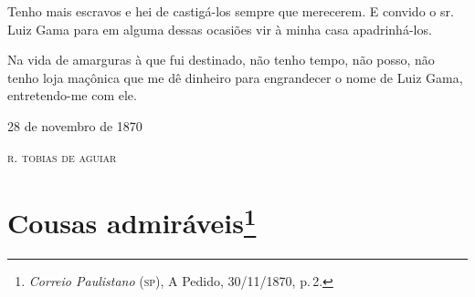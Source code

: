 Tenho mais escravos e hei de castigá-los sempre que merecerem. E convido
o sr.\,Luiz Gama para em alguma dessas ocasiões vir à minha casa
apadrinhá-los.

Na vida de amarguras à que fui destinado, não tenho tempo, não posso,
não tenho loja maçônica que me dê dinheiro para engrandecer o nome de
Luiz Gama, entretendo-me com ele.

\begin{flushright}
28 de novembro de 1870

\textsc{r. tobias de aguiar}
\end{flushright}

\chapter{Cousas admiráveis\footnote{\emph{Correio Paulistano} (\textsc{sp}), A Pedido, 30/11/1870,
  p.\,2.}} %


